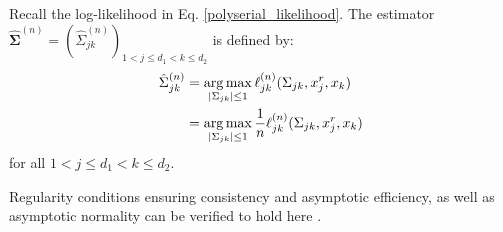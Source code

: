 \begin{definition}\label{definition_case2}
    Recall the log-likelihood in Eq. \eqref{polyserial_likelihood}. The estimator $\hat{\mathbf{\Sigma}}^{(n)} = (\hat{\Sigma}_{jk}^{(n)})_{1 < j \leq d_1 < k \leq d_2}$ is defined by:
    \begin{equation}
        \begin{split}
            \hat{\Sigma}_{jk}^{(n)} &= \argmax_{\Abs{\Sigma_{jk}} \leq 1} \ell_{jk}^{(n)}(\Sigma_{jk}, x^r_j,x_k) \\
            &= \argmax_{\Abs{\Sigma_{jk}} \leq 1} \frac{1}{n} \ell_{jk}^{(n)}(\Sigma_{jk}, x^r_j,x_k)
        \end{split}
    \end{equation}
    for all $1 < j \leq d_1 < k \leq d_2$.
\end{definition}
\noindent Regularity conditions ensuring consistency and asymptotic efficiency, as well as asymptotic normality can be verified to hold here \citep{Cox74}.

